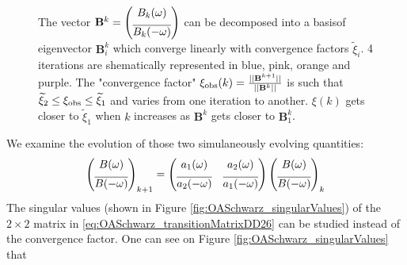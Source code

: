 \begin{figure}[htpb]
	\centering
	\caption[The convergence factor $\xi(k)$ varies and is bounded]{
	The vector
	$\mathbf{B}^k= \begin{pmatrix} B_k(\omega) \vspace{0.15cm}\\
	\overline{B_k(-\omega)} \end{pmatrix}$
	can be decomposed into a basis\footnotemark of eigenvector
	$\mathbf{B}_i^k$ which converge linearly with
	convergence factors $\widetilde{\xi}_i$.
	4 iterations are shematically represented in blue, pink,
	orange and purple. The "convergence factor"
	$\xi_{\rm obs}(k)=\frac{||\mathbf{B}^{k+1}||}{||\mathbf{B}^{k}||}$
	is such that
	$\widetilde{\xi}_2 \leq \xi_{\rm obs} \leq \widetilde{\xi}_1$ and
	varies from one iteration to another. $\xi(k)$
	gets closer to $\widetilde{\xi}_1$ when $k$ increases as
	$\mathbf{B}^k$ gets closer to $\mathbf{B}^k_1$.
	}
	\label{fig:OASchwarz_rateBetweenEigenvalues}
\end{figure}
We examine the evolution of those two
simulaneously evolving quantities:
\begin{equation}
	\label{eq:OASchwarz_transitionMatrixDD26}
\begin{pmatrix}
	B(\omega) \vspace{0.15cm}\\
	\overline{B(-{\omega})}
\end{pmatrix}_{k+1}
 =
\begin{pmatrix}
	a_1(\omega) & a_2(\omega) \vspace{0.15cm}\\
	\overline{a_2(-{\omega})} & \overline{a_1(-{\omega})} \\
\end{pmatrix}
\begin{pmatrix}
	B(\omega) \vspace{0.15cm}\\
	\overline{B(-{\omega})}
\end{pmatrix}_{k}
\end{equation}
The singular values (shown in Figure \ref{fig:OASchwarz_singularValues})
of the $2\times 2$ matrix
in \eqref{eq:OASchwarz_transitionMatrixDD26}
can be studied instead of the convergence factor.
One can see on Figure \ref{fig:OASchwarz_singularValues} that
